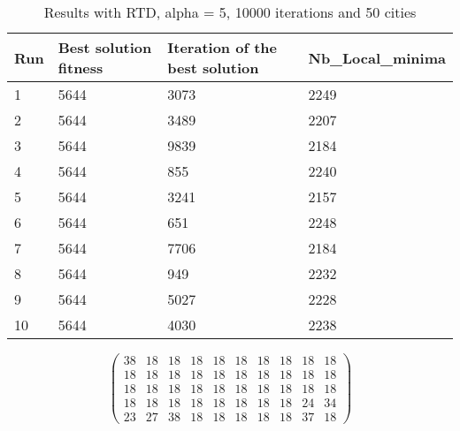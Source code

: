 \documentclass[12pt,oneside,a4paper]{article}
\begin{document}
  \begin{table}[h]
    \centering
    \small
    \begin{tabular}{llll}
      \hline
      \multicolumn{1}{|l|}{\textbf{Run}}& \multicolumn{1}{l|}{\textbf{Best solution fitness}}& \multicolumn{1}{l|}{\textbf{Iteration of the best solution}}& \multicolumn{1}{l|}{\textbf{Nb\_Local\_minima}}\\ \hline
      \multicolumn{1}{|l|}{1} & \multicolumn{1}{l|}{5644}  & \multicolumn{1}{l|}{3073} & \multicolumn{1}{l|}{2249}  \\ \hline
      \multicolumn{1}{|l|}{2} & \multicolumn{1}{l|}{5644}  & \multicolumn{1}{l|}{3489} & \multicolumn{1}{l|}{2207}  \\ \hline         
      \multicolumn{1}{|l|}{3} & \multicolumn{1}{l|}{5644}  & \multicolumn{1}{l|}{9839}  & \multicolumn{1}{l|}{2184}  \\ \hline
      \multicolumn{1}{|l|}{4} & \multicolumn{1}{l|}{5644}  & \multicolumn{1}{l|}{855}  & \multicolumn{1}{l|}{2240}  \\ \hline
      \multicolumn{1}{|l|}{5} & \multicolumn{1}{l|}{5644}  & \multicolumn{1}{l|}{3241}  & \multicolumn{1}{l|}{2157}  \\ \hline
      \multicolumn{1}{|l|}{6} & \multicolumn{1}{l|}{5644}  & \multicolumn{1}{l|}{651}  & \multicolumn{1}{l|}{2248}  \\ \hline
      \multicolumn{1}{|l|}{7} & \multicolumn{1}{l|}{5644}  & \multicolumn{1}{l|}{7706}  & \multicolumn{1}{l|}{2184}  \\ \hline
      \multicolumn{1}{|l|}{8} & \multicolumn{1}{l|}{5644}  & \multicolumn{1}{l|}{949} & \multicolumn{1}{l|}{2232}  \\ \hline
      \multicolumn{1}{|l|}{9} & \multicolumn{1}{l|}{5644}  & \multicolumn{1}{l|}{5027} & \multicolumn{1}{l|}{2228}  \\ \hline
      \multicolumn{1}{|l|}{10} & \multicolumn{1}{l|}{5644}  & \multicolumn{1}{l|}{4030} & \multicolumn{1}{l|}{2238}  \\ \hline
    \end{tabular}
    \caption{Results with RTD, alpha = 5, 10000 iterations and 50 cities}
  \end{table}

  \begin{equation}
    \begin{pmatrix} 38 & 18 & 18 & 18 & 18 & 18 & 18 & 18 & 18 & 18 \\
                    18 & 18 & 18 & 18 & 18 & 18 & 18 & 18 & 18 & 18 \\
                    18 & 18 & 18 & 18 & 18 & 18 & 18 & 18 & 18 & 18\\
                    18 & 18 & 18 & 18 & 18 & 18 & 18 & 18 & 24 & 34 \\
                    23 & 27 & 38 & 18 & 18 & 18 & 18 & 18 & 37 & 18 
    \end{pmatrix}
  \end{equation}
\end{document}
